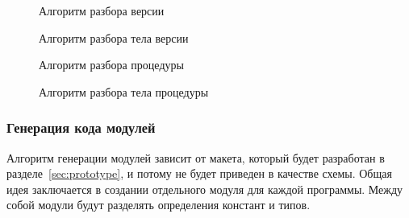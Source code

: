 \clearpage

\vspace*{\fill}
\begin{figure}[!h]
    \centering
    \def\svgwidth{\textwidth}
    
    \caption{Алгоритм разбора версии}
    \label{fig:parser_version_alg}
\end{figure}
\vfill
\begin{figure}[!h]
    \centering
    \def\svgwidth{0.4\textwidth}
    
    \caption{Алгоритм разбора тела версии}
    \label{fig:parser_version_body_alg}
\end{figure}
\vfill

\clearpage

\vspace*{\fill}
\begin{figure}[!h]
    \centering
    \def\svgwidth{\textwidth}
    
    \caption{Алгоритм разбора процедуры}
    \label{fig:parser_procedure_alg}
\end{figure}
\vfill
\begin{figure}[!h]
    \centering
    \def\svgwidth{0.5\textwidth}
    
    \caption{Алгоритм разбора тела процедуры}
    \label{fig:parser_procedure_args_alg}
\end{figure}
\vfill

\clearpage

\subsubsection{Генерация кода модулей}

Алгоритм генерации модулей зависит от макета, который будет разработан в
разделе~\ref{sec:prototype}, и потому не будет приведен в качестве схемы. Общая
идея заключается в создании отдельного модуля для каждой программы. Между собой
модули будут разделять определения констант и типов.


